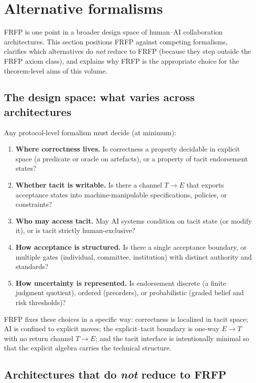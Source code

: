 \section{Alternative formalisms}
\label{sec:alternative-formalisms}

FRFP is one point in a broader design space of human--AI collaboration architectures. This section
positions FRFP against competing formalisms, clarifies which alternatives do \emph{not} reduce to
FRFP (because they step outside the FRFP axiom class), and explains why FRFP is the appropriate
choice for the theorem-level aims of this volume.

\subsection{The design space: what varies across architectures}

Any protocol-level formalism must decide (at minimum):
\begin{enumerate}[leftmargin=2em]
  \item \textbf{Where correctness lives.} Is correctness a property decidable in explicit space (a predicate or oracle on artefacts), or a property of tacit endorsement states?
  \item \textbf{Whether tacit is writable.} Is there a channel \(T\to E\) that exports acceptance states into machine-manipulable specifications, policies, or constraints?
  \item \textbf{Who may access tacit.} May AI systems condition on tacit state (or modify it), or is tacit strictly human-exclusive?
  \item \textbf{How acceptance is structured.} Is there a single acceptance boundary, or multiple gates (individual, committee, institution) with distinct authority and standards?
  \item \textbf{How uncertainty is represented.} Is endorsement discrete (a finite judgment quotient), ordered (preorders), or probabilistic (graded belief and risk thresholds)?
\end{enumerate}
FRFP fixes these choices in a specific way: correctness is localized in tacit space; AI is confined to
explicit moves; the explicit--tacit boundary is one-way \(E\to T\) with no return channel \(T\to E\);
and the tacit interface is intentionally minimal so that the explicit algebra carries the technical
structure.

\subsection{Architectures that do \emph{not} reduce to FRFP}

